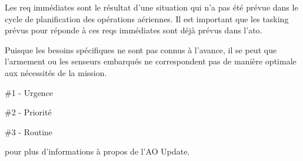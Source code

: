 Les \gls{req} immédiates sont le résultat d'une situation qui n'a pas été prévue dans le cycle de planification des opérations aériennes. Il est important que les tasking prévus pour réponde à ces \glspl{req} immédiates sont déjà prévus dans l'\gls{ato}.

Puisque les besoins spécifiques ne sont pas connus à l'avance, il se peut que l'armement ou les senseurs embarqués ne correspondent pas de manière optimale aux nécessités de la mission.

\begin{e1}
	\begin{e2}
		\item \#1 - Urgence
		\item \#2 - Priorité
		\item \#3 - Routine
	\end{e2}
	 pour plus d'informations à propos de l'AO Update.
\end{e1}



